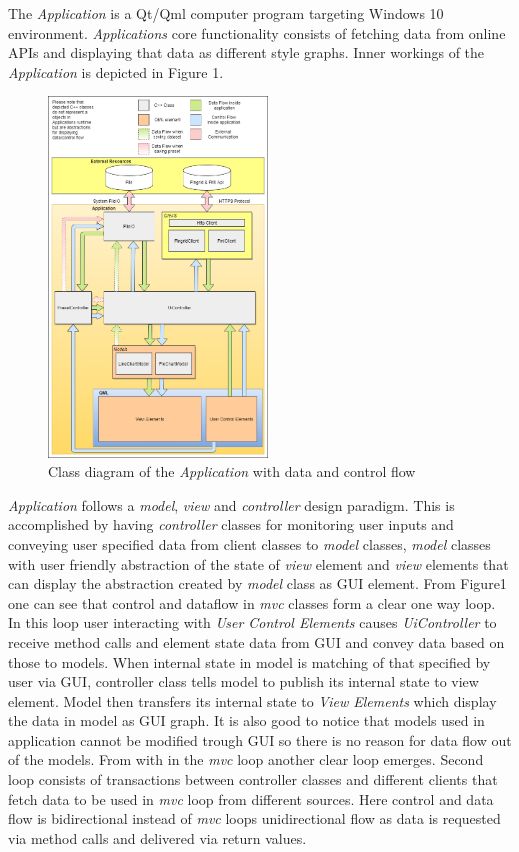\documentclass{article}
\begin{document}
The \emph{Application} is a Qt/Qml computer program targeting Windows 10 environment. \emph{Applications} core functionality consists of fetching data from online APIs and displaying that data as different style graphs. Inner workings of the \emph{Application} is depicted in Figure 1.


\begin{figure}[htbp]
\centering
\includegraphics[width=0.52\textwidth]{classdiagram}
\caption{ Class diagram of the \emph{Application} with data and control flow}
\end{figure}


\pagebreak

\emph{Application} follows a \emph{model}, \emph{view} and \emph{controller} design paradigm. This is accomplished by having \emph{controller} classes for monitoring user inputs and conveying user specified data from client classes to \emph{model} classes, \emph{model} classes with user friendly abstraction of the state of \emph{view} element and \emph{view} elements that  can display the abstraction created by \emph{model} class as GUI element. From Figure1 one can see that control and dataflow in \emph{mvc} classes form a clear one way loop. In this loop user interacting with \emph{User Control Elements} causes \emph{UiController} to receive method calls and element state data from GUI and convey data based on those to models. When internal state in model is matching of that specified by user via GUI, controller class tells model to publish its internal state to view element. Model then transfers its internal state to \emph{View Elements} which display the data in model as GUI graph.  It is also good to notice that models used in application cannot be modified trough GUI so there is no reason for data flow out of the models. From with in the \emph{mvc} loop another clear loop emerges. Second loop consists of transactions between controller classes and different clients that fetch data to be used in \emph{mvc} loop from different sources. Here control and data flow is bidirectional instead of \emph{mvc} loops unidirectional flow as data is requested via method calls and delivered via return values.
\end{document}
